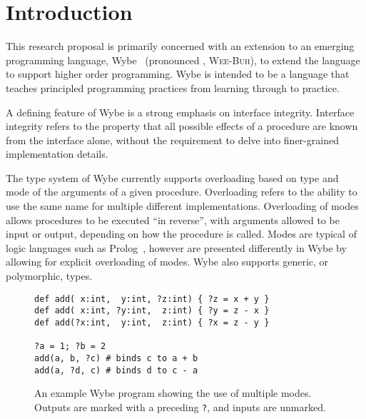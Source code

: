 \clearpage 

\def\chaptertitle{Introduction}

\lhead{\emph{\chaptertitle}}

\chapter{\chaptertitle}
\label{ch:intro}

This research proposal is primarily concerned with an extension to an emerging programming language, Wybe~\cite{schachte2015wybe} (pronounced , \textsc{Wee-Buh}), to extend the language to support higher order programming. Wybe is intended to be a language that teaches principled programming practices from learning through to practice.

A defining feature of Wybe is a strong emphasis on interface integrity. Interface integrity refers to the property that all possible effects of a procedure are known from the interface alone, without the requirement to delve into finer-grained implementation details.

The type system of Wybe currently supports overloading based on type and mode of the arguments of a given procedure. Overloading refers to the ability to use the same name for multiple different implementations. Overloading of modes allows procedures to be executed ``in reverse'', with arguments allowed to be input or output, depending on how the procedure is called. Modes are typical of logic languages such as Prolog~\cite{colmerauer1996birth}, however are presented differently in Wybe by allowing for explicit overloading of modes. Wybe also supports generic, or polymorphic, types. 

\begin{figure}[ht]
  \centering
  \begin{varwidth}{\linewidth}
    \begin{verbatim}
def add( x:int,  y:int, ?z:int) { ?z = x + y } 
def add( x:int, ?y:int,  z:int) { ?y = z - x }
def add(?x:int,  y:int,  z:int) { ?x = z - y }

?a = 1; ?b = 2
add(a, b, ?c) # binds c to a + b
add(a, ?d, c) # binds d to c - a
\end{verbatim}
  \end{varwidth}
  \caption{An example Wybe program showing the use of multiple modes. Outputs are marked with a preceding \texttt{?}, and inputs are unmarked.}
  \label{fig:wybe-mode-example}
\end{figure}

